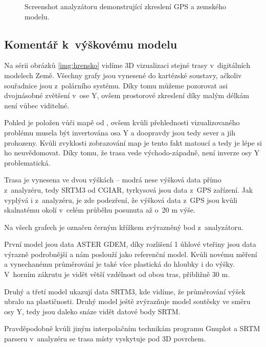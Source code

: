 \documentclass[thesis=B,czech]{FITthesis}[2012/06/26]
\begin{document}
\begin{figure}[htp]
\caption{Screenshot analyzátoru demonstrující zkreslení GPS a zemského modelu.}
\label{img:analyzatorScreen}
\end{figure}


\subsection{Komentář k~výškovému modelu}

Na sérii obrázků \ref{img:hrensko} vidíme 3D vizualizaci stejné trasy v~digitálních modelech Země. Všechny grafy jsou vynesené do kartézské soustavy, ačkoliv souřadnice jsou z~polárního systému. Díky tomu můžeme pozorovat asi dvojnásobné zvětšení v~ose Y, ovšem prostorové zkreslení díky malým délkám není vůbec viditelné. 

Pohled je položen vůči mapě od , ovšem kvůli přehlednosti vizualizovaného problému musela být invertována osa Y a doopravdy jsou tedy sever a jih prohozeny. Kvůli zvyklosti zobrazování map je tento fakt matoucí a tedy je lépe si ho neuvědomovat. Díky tomu, že trasa vede východo-západně, není inverze osy Y problematická.

Trasa je vynesena ve dvou výškách -- modrá nese výšková data přímo z~analyzéru, tedy SRTM3 od CGIAR, tyrkysová jsou data z~GPS zařízení. Jak vyplývá i z~analyzéru, je zde podezření, že výšková data z~GPS jsou kvůli skalnatému okolí v~celém průběhu posunuta až o~20 m výše.

Na všech grafech je označen černým křížkem zvýrazněný bod z~analyzátoru.

První model jsou data ASTER GDEM, díky rozlišení 1 úhlové vteřiny jsou data výrazně podrobnější a nám poslouží jako referenční model. Kvůli novému měření a vynechanému průměrování je také více plastická do hloubky i do výšky. V~horním zákrutu je vidět větší vzdélnost od obou tras, přibližně 30 m.

Druhý a třetí model ukazují data SRTM3, kde vidíme, že průměrování výšek ubralo na plastičnosti. Druhý model ještě zvýrazňuje model soutěsky ve směru osy Y, tedy jsou daleko snáze vidět datové body SRTM.

Pravděpodobně kvůli jiným interpolačním technikám programu Gnuplot a SRTM parseru v~analyzéru se trasa místy vyskytuje pod 3D povrchem.
\end{document}
